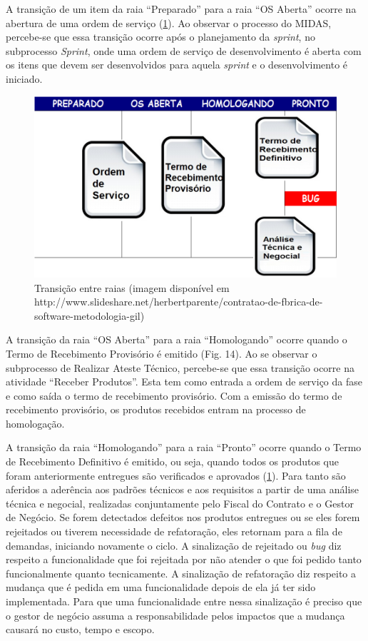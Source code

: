 A transição de um item da raia “Preparado” para a raia “OS Aberta” ocorre na abertura de uma ordem de serviço (\ref{kanban3}). Ao observar o processo do MIDAS, percebe-se que essa transição ocorre após o planejamento da \textit{sprint}, no subprocesso \textit{Sprint}, onde uma ordem de serviço de desenvolvimento é aberta  com os itens que devem ser desenvolvidos para aquela \textit{sprint} e o desenvolvimento é iniciado. 

\begin{figure}[H]
		\centering
		
			\includegraphics[scale=0.5]{figuras/kanbanIPHAN3.png}
		\caption{Transição entre raias (imagem disponível em http://www.slideshare.net/herbertparente/contratao-de-fbrica-de-software-metodologia-gil)}
		\label{kanban3}
\end{figure}

A transição da raia “OS Aberta” para a raia “Homologando” ocorre quando o Termo de Recebimento Provisório é emitido (Fig. 14). Ao se observar o subprocesso de Realizar Ateste Técnico, percebe-se que essa transição ocorre na atividade “Receber Produtos”. Esta tem como entrada a ordem de serviço da fase e como saída o termo de recebimento provisório. Com a emissão do termo de recebimento provisório, os produtos recebidos entram na processo de homologação. 

A transição da raia “Homologando” para a raia “Pronto” ocorre quando o Termo de Recebimento Definitivo é emitido, ou seja, quando todos os produtos que foram anteriormente entregues são verificados e aprovados (\ref{kanban3}). Para tanto são aferidos a aderência aos padrões técnicos e aos requisitos a partir de uma análise técnica e negocial, realizadas conjuntamente pelo Fiscal do Contrato e o Gestor de Negócio. Se forem detectados defeitos nos produtos entregues ou se eles forem rejeitados ou tiverem necessidade de refatoração, eles retornam para a fila de demandas, iniciando novamente o ciclo. A sinalização de rejeitado ou \textit{bug} diz respeito a funcionalidade que foi rejeitada por não atender o que foi pedido tanto funcionalmente quanto tecnicamente. A sinalização de refatoração diz respeito a mudança que é pedida em uma funcionalidade depois de ela já ter sido implementada. Para que uma funcionalidade entre nessa sinalização é preciso que o gestor de negócio assuma a responsabilidade pelos impactos que a mudança causará no custo, tempo e escopo.

